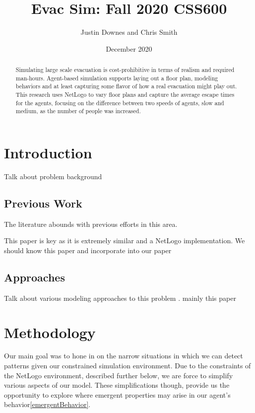 \documentclass[12pt,letterpaper]{article}
\begin{document}
\title{Evac Sim: Fall 2020 CSS600 }

\author{Justin Downes and Chris Smith}
\date{December 2020}
\maketitle

\begin{abstract}
Simulating large scale evacuation is cost-prohibitive in terms of realism and
required man-hours. Agent-based simulation supports laying out a floor plan,
modeling behaviors and at least capturing some flavor of how a real evacuation
might play out. This research uses NetLogo to vary floor plans and capture the
average escape times for the agents, focusing on the difference between two
speeds of agents, slow and medium, as  the number of people was increased.
\end{abstract}
\section {Introduction}
Talk about problem background
 
\subsection{Previous Work}
The literature abounds with previous efforts in this area.
\cite{almeidaCrowdSimulationModeling2013} 
\cite{kneidl}
\cite{kuligowskil}
\cite{abmEvac}
\cite{zhouSimulationPedestrianEvacuation2019}

This paper is key as it is extremely similar and a NetLogo implementation.  We should know this paper and incorporate into our paper \cite{prioritEvac}
\subsection {Approaches}
Talk about various modeling approaches to this problem   . mainly this paper \cite{almeidaCrowdSimulationModeling2013} 
\section {Methodology}

Our main goal was to hone in on the narrow situations in which we can detect patterns given our constrained simulation environment.  Due to the constraints of the  NetLogo environment, described further below, we are force to simplify various aspects of our model.  These simplifications though, provide us the opportunity to explore where emergent properties may arise in our agent's behavior\ref{emergentBehavior}.
\end{document}
